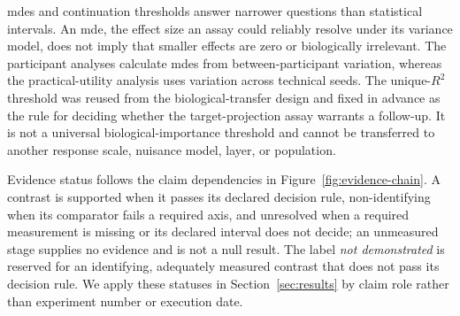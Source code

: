  \acp{mde} and continuation thresholds answer narrower questions than statistical intervals.
An \ac{mde}, the effect size an assay could reliably resolve under its variance model, does not imply that smaller effects are zero or biologically irrelevant.
The participant analyses calculate \acp{mde} from between-participant variation, whereas the practical-utility analysis uses variation across technical seeds.
The  unique-\(R^2\) threshold was reused from the biological-transfer design and fixed in advance as the rule for deciding whether the target-projection assay warrants a follow-up.
It is not a universal biological-importance threshold and cannot be transferred to another response scale, nuisance model, layer, or population.

Evidence status follows the claim dependencies in Figure~\ref{fig:evidence-chain}.
A contrast is supported when it passes its declared decision rule, non-identifying when its comparator fails a required axis, and unresolved when a required measurement is missing or its declared interval does not decide; an unmeasured stage supplies no evidence and is not a null result.
The label \emph{not demonstrated} is reserved for an identifying, adequately measured contrast that does not pass its decision rule.
We apply these statuses in Section~\ref{sec:results} by claim role rather than experiment number or execution date.
